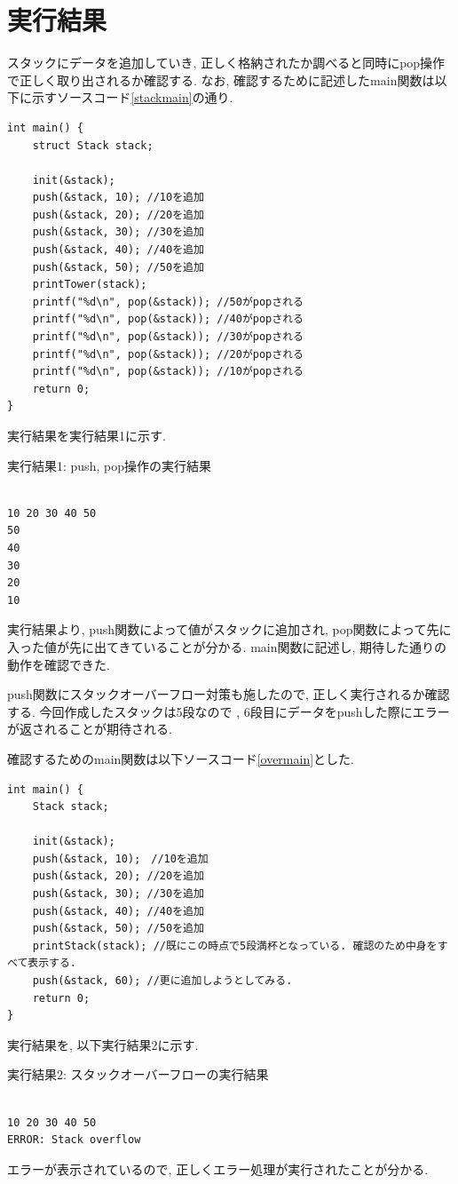\documentclass[a4j]{jsarticle}
\begin{document}
    
    
\section{実行結果}
    スタックにデータを追加していき, 正しく格納されたか調べると同時にpop操作で正しく取り出されるか確認する. 
    なお, 確認するために記述したmain関数は以下に示すソースコード\ref{stackmain}の通り. 
    \begin{lstlisting}[label = stackmain, caption = スタックの動作確認のためのmain関数]
int main() {
	struct Stack stack;

	init(&stack);
	push(&stack, 10); //10を追加
	push(&stack, 20); //20を追加
	push(&stack, 30); //30を追加
	push(&stack, 40); //40を追加
	push(&stack, 50); //50を追加
	printTower(stack);
	printf("%d\n", pop(&stack)); //50がpopされる
	printf("%d\n", pop(&stack)); //40がpopされる
	printf("%d\n", pop(&stack)); //30がpopされる
	printf("%d\n", pop(&stack)); //20がpopされる
	printf("%d\n", pop(&stack)); //10がpopされる
	return 0;
}
    \end{lstlisting}

    実行結果を実行結果1に示す. 
    \begin{breakitembox}[l]{実行結果1: push, pop操作の実行結果}
    \begin{verbatim}

10 20 30 40 50
50
40
30
20
10
    \end{verbatim}
    \end{breakitembox}
実行結果より, push関数によって値がスタックに追加され, pop関数によって先に入った値が先に出てきていることが分かる. 
main関数に記述し, 期待した通りの動作を確認できた. 

push関数にスタックオーバーフロー対策も施したので, 正しく実行されるか確認する. 今回作成したスタックは5段なので
, 6段目にデータをpushした際にエラーが返されることが期待される. 

確認するためのmain関数は以下ソースコード\ref{overmain}とした. 
\begin{lstlisting}[label = overmain, caption = スタックオーバーフローの動作確認のためのmain関数]
int main() {
	Stack stack;

	init(&stack);
	push(&stack, 10);　//10を追加
	push(&stack, 20); //20を追加
	push(&stack, 30); //30を追加
	push(&stack, 40); //40を追加
	push(&stack, 50); //50を追加
	printStack(stack); //既にこの時点で5段満杯となっている. 確認のため中身をすべて表示する. 
	push(&stack, 60); //更に追加しようとしてみる. 
	return 0;
}
\end{lstlisting}
実行結果を, 以下実行結果2に示す. 
\begin{breakitembox}[l]{実行結果2: スタックオーバーフローの実行結果}
\begin{verbatim}

10 20 30 40 50
ERROR: Stack overflow
\end{verbatim}
\end{breakitembox}
エラーが表示されているので, 正しくエラー処理が実行されたことが分かる. 
\end{document}
